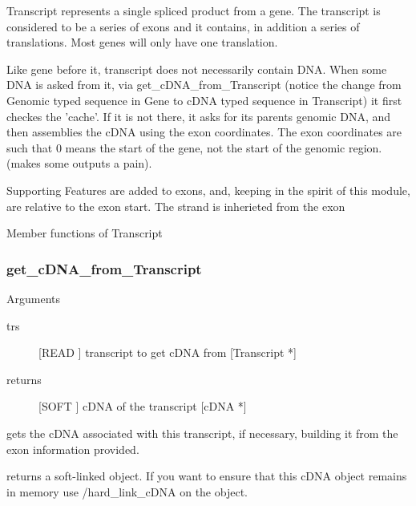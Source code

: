 Transcript represents a single spliced product from a gene. The
transcript is considered to be a series of exons and it contains, in
addition a series of translations. Most genes will only have one
translation.


Like gene before it, transcript does not necessarily contain
DNA. When some DNA is asked from it, via get_cDNA_from_Transcript
(notice the change from Genomic typed sequence in Gene to cDNA
typed sequence in Transcript) it first checkes the 'cache'. 
If it is not there, it asks for its parents genomic DNA, and
then assemblies the cDNA using the exon coordinates. The exon
coordinates are such that 0 means the start of the gene, not
the start of the genomic region. (makes some outputs a pain).


Supporting Features are added to exons, and, keeping in the spirit of
this module, are relative to the exon start. The strand is inherieted
from the exon






Member functions of Transcript

\subsubsection{get_cDNA_from_Transcript}

Arguments
\begin{description}
\item[trs] [READ ] transcript to get cDNA from [Transcript *]
\item[returns] [SOFT ] cDNA of the transcript [cDNA *]
\end{description}
gets the cDNA associated with this transcript,
if necessary, building it from the exon information
provided.


returns a soft-linked object. If you want to ensure
that this cDNA object remains in memory use
/hard_link_cDNA on the object.


